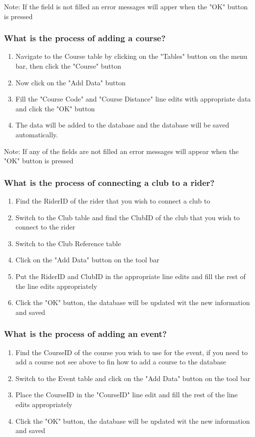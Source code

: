 Note: If  the field is not filled an error messages will apper when the "OK" button is pressed

\subsubsection{What is the process of adding a course?}
\begin{enumerate}
\item Navigate to the Course table by clicking on the "Tables" button on the menu bar, then click the "Course" button
\item Now click on the "Add Data" button
\item Fill the "Course Code" and "Course Distance" line edits with appropriate data and click the "OK" button
\item The data will be added to the database and the database will be saved automatically.
\end{enumerate}

Note: If  any of the fields are not filled an error messages will appear when the "OK" button is pressed

\subsubsection{What is the process of connecting a club to a rider?}
\begin{enumerate}
\item Find the RiderID of the rider that you wish to connect a club to
\item Switch to the Club table and find the ClubID of the club that you wish to connect to the rider
\item Switch to the Club Reference table
\item Click on the "Add Data" button on the tool bar
\item Put the RiderID and ClubID in the appropriate line edits and fill the rest of the line edits appropriately
\item Click the "OK" button, the database will be updated wit the new information and saved
\end{enumerate}
\subsubsection{What is the process of adding an event?}
\begin{enumerate}
\item Find the CourseID of the course you wish to use for the event, if you need to add a course not see above to fin how to add a course to the database
\item Switch to the Event table and click on the "Add Data" button on the tool bar
\item Place the CourseID in the "CourseID" line edit and fill the rest of the line edits appropriately
\item Click the "OK" button, the database will be updated wit the new information and saved
\end{enumerate}
